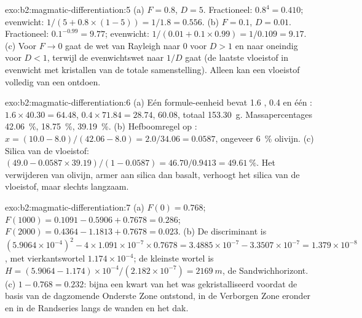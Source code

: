 \begin{solution}{exo:b2:magmatic-differentiation:5}
(a) $F = 0.8$, $D = 5$. Fractioneel: $0.8^{4} = 0.410$; evenwicht:
$1/(5 + 0.8\times(1 - 5)) = 1/1.8 = 0.556$. (b) $F = 0.1$, $D = 0.01$. Fractioneel:
$0.1^{-0.99} = 9.77$; evenwicht: $1/(0.01 + 0.1\times0.99) = 1/0.109 = 9.17$.
(c) Voor $F \to 0$ gaat de wet van Rayleigh naar $0$ voor $D > 1$ en naar oneindig voor
$D < 1$, terwijl de evenwichtswet naar $1/D$ gaat (de laatste vloeistof in evenwicht
met kristallen van de totale samenstelling). Alleen  kan een
vloeistof volledig van een  ontdoen.
\end{solution}

\begin{solution}{exo:b2:magmatic-differentiation:6}
(a) Eén formule-eenheid bevat 1.6 , 0.4  en één : $1.6\times
40.30 = 64.48$, $0.4\times71.84 = 28.74$, 60.08, totaal \qty{153.30}{g}.
Massapercentages  \qty{42.06}{\percent},  \qty{18.75}{\percent},
 \qty{39.19}{\percent}. (b) Hefboomregel op : $x = (10.0 - 8.0)/(42.06
- 8.0) = 2.0/34.06 = 0.0587$, ongeveer \qty{6}{\percent} olivijn. (c) Silica van de
vloeistof: $(49.0 - 0.0587\times39.19)/(1 - 0.0587) = 46.70/0.9413 =
\qty{49.61}{\percent}$. Het verwijderen van olivijn, armer aan silica dan basalt, verhoogt het
silica van de vloeistof, maar slechts langzaam.
\end{solution}

\begin{solution}{exo:b2:magmatic-differentiation:7}
(a) $F(0) = 0.768$; $F(1000) = 0.1091 - 0.5906 + 0.7678 = 0.286$; $F(2000) = 0.4364
- 1.1813 + 0.7678 = 0.023$. (b) De discriminant is $(5.9064\times10^{-4})^2 -
4\times1.091\times10^{-7}\times0.7678 = 3.4885\times10^{-7} - 3.3507\times10^{-7} =
1.379\times10^{-8}$, met vierkantswortel $1.174\times10^{-4}$; de kleinste wortel is
$H = (5.9064 - 1.174)\times10^{-4}/(2.182\times10^{-7}) = \qty{2169}{m}$, de
Sandwichhorizont. (c) $1 - 0.768 = 0.232$: bijna een kwart van het  was
gekristalliseerd voordat de basis van de dagzomende Onderste Zone ontstond, in de Verborgen Zone
eronder en in de Randseries langs de wanden en het dak.
\end{solution}


